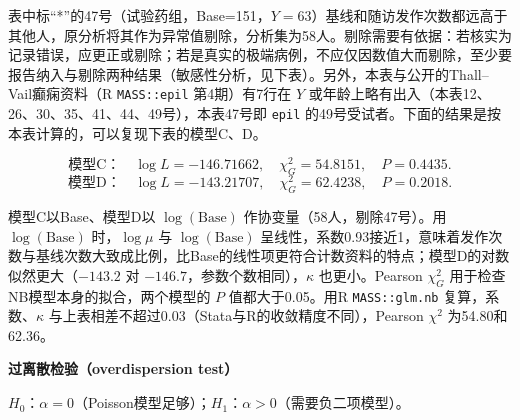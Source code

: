 \begin{annotation}表中标“*”的47号（试验药组，Base=151，$Y=63$）基线和随访发作次数都远高于其他人，原分析将其作为异常值剔除，分析集为58人。剔除需要有依据：若核实为记录错误，应更正或剔除；若是真实的极端病例，不应仅因数值大而剔除，至少要报告纳入与剔除两种结果（敏感性分析，见下表）。另外，本表与公开的Thall--Vail癫痫资料（R \texttt{MASS::epil} 第4期）有7行在 $Y$ 或年龄上略有出入（本表12、26、30、35、41、44、49号），本表47号即 \texttt{epil} 的49号受试者。下面的结果是按本表计算的，可以复现下表的模型C、D。\end{annotation}
\[\text{模型C：}\quad\log L=-146.71662,\quad\chi_G^2=54.8151,\quad P=0.4435.\]\[\text{模型D：}\quad\log L=-143.21707,\quad\chi_G^2=62.4238,\quad P=0.2018.\]
\begin{annotation}模型C以Base、模型D以 $\log(\text{Base})$ 作协变量（58人，剔除47号）。用 $\log(\text{Base})$ 时，$\log\mu$ 与 $\log(\text{Base})$ 呈线性，系数0.93接近1，意味着发作次数与基线次数大致成比例，比Base的线性项更符合计数资料的特点；模型D的对数似然更大（$-143.2$ 对 $-146.7$，参数个数相同），$\kappa$ 也更小。Pearson $\chi_G^2$ 用于检查NB模型本身的拟合，两个模型的 $P$ 值都大于0.05。用R \texttt{MASS::glm.nb} 复算，系数、$\kappa$ 与上表相差不超过0.03（Stata与R的收敛精度不同），Pearson $\chi^2$ 为54.80和62.36。\end{annotation}
\textbf{过离散检验（overdispersion test）}

$H_0$：$\alpha=0$（Poisson模型足够）；$H_1$：$\alpha>0$（需要负二项模型）。

